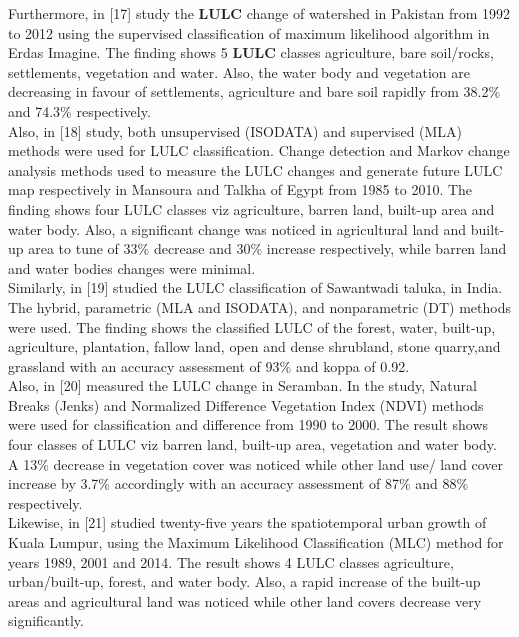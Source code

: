 \documentclass[10pt]{report}
\begin{document}
\begin{flushleft}
		Furthermore, in [17] study the \textbf{LULC} change of watershed in Pakistan from 1992 to 2012 using the supervised classification of	maximum likelihood algorithm in Erdas Imagine. The finding	shows 5 \textbf{LULC} classes agriculture, bare soil/rocks, settlements, vegetation and water. Also, the water body and vegetation are	decreasing in favour of settlements, agriculture and bare soil rapidly from 38.2\% and 74.3\% respectively.\\
		
		Also, in [18] study, both unsupervised (ISODATA) and supervised (MLA) methods were used for LULC classification. Change
		detection and Markov change analysis methods used to measure 	the LULC changes and generate future LULC map respectively in 	Mansoura and Talkha of Egypt from 1985 to 2010. The finding 	shows four LULC classes viz agriculture, barren land, built-up	area and water body. Also, a significant change was noticed in	agricultural land and built-up area to tune of 33$\%$ decrease and	30$\%$ increase respectively, while barren land and water bodies
		changes were minimal.\\
		
		Similarly, in [19] studied the LULC classification of Sawantwadi taluka, in India. The hybrid, parametric (MLA and ISODATA),	and nonparametric (DT) methods were used. The finding shows	the classified LULC of the forest, water, built-up, agriculture, 	plantation, fallow land, open and dense shrubland, stone quarry,and grassland with an accuracy assessment of 93$\%$ and koppa of	0.92.\\
		
		Also, in [20] measured the LULC change in Seramban. In the	study, Natural Breaks (Jenks) and Normalized Difference Vegetation Index (NDVI) methods were used for classification and difference from 1990 to 2000. The result shows four classes of	LULC viz barren land, built-up area, vegetation and water body. A	13$\%$ decrease in vegetation cover was noticed while other land	use/ land cover increase by 3.7$\%$ accordingly with an accuracy	assessment of 87$\%$ and 88$\%$ respectively.\\
		
		Likewise, in [21] studied twenty-five years the spatiotemporal	urban growth of Kuala Lumpur, using the Maximum Likelihood	Classification (MLC) method for years 1989, 2001 and 2014. The	result shows 4 LULC classes agriculture, urban/built-up, forest,	and water body. Also, a rapid increase of the built-up areas and	agricultural land was noticed while other land covers decrease very significantly.\\
		

\end{flushleft}
\end{document}
